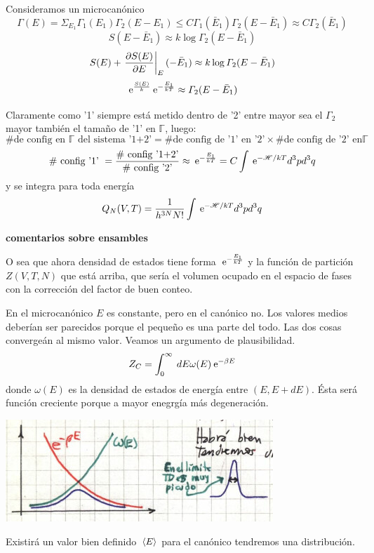 \documentclass[10pt,oneside]{CBFT_book}
\begin{document}
Consideramos un microcanónico 
\[
	\Gamma(E) = \Sigma_{E_1} \Gamma_1(E_1) \Gamma_2(E-E_1) \leq C \Gamma_1(\bar{E}_1) \Gamma_2(E-\bar{E}_1)
	\approx C \Gamma_2(\bar{E}_1)
\]
\[
	S(E-\bar{E}_1) \approx k \log \Gamma_2(E-\bar{E}_1)
\]
\[
	S(E) + \left.\frac{\partial^{\hspace{-0.05em}} {S(E)}}{\partial {E}^{\hspace{-0.05em}}}\right|_E(-\bar{E}_1) \approx k \log \Gamma_2(E-\bar{E}_1)
\]
\[
	\:\mathrm{e}^{\frac{S(E)}{k}} \:\mathrm{e}^{-\frac{E_1}{kT}} \approx \Gamma_2(E-\bar{E}_1)
\]

Claramente como '1' siempre está metido dentro de '2' entre mayor sea el $\Gamma_2$ mayor también el tamaño de '1'
en $\mathbb{\Gamma}$, luego:
\[
	\# \text{de config en } \mathbb{\Gamma} \text{ del sistema '1+2'} = \# \text{de config de '1' en '2'} \times 
	\# \text{de config de '2' en} \mathbb{\Gamma}
\]
\[
	\# \text{ config '1' } = \frac{ \# \text{ config '1+2'} }{ \# \text{ config '2'} } \approx 
	\:\mathrm{e}^{-\frac{E_1}{kT}} = C \int \:\mathrm{e}^{-\mathscr{H}/kT} d^3p d^3q
\]
y se integra para toda energía
\[
	Q_N(V,T) = \frac{1}{h^{3N}N!}\int \:\mathrm{e}^{-\mathscr{H}/kT} d^3p d^3q
\]

{\bf comentarios sobre ensambles}

O sea que ahora densidad de estados tiene forma $\:\mathrm{e}^{-\frac{E_1}{kT}}$ y la función de partición
$Z(V,T,N)$ que está arriba, que sería el volumen ocupado en el espacio de fases con la corrección
del factor de buen conteo.


En el microcanónico $E$ es constante, pero en el canónico no. Los valores medios deberían ser parecidos
porque el pequeño es una parte del todo.
Las dos cosas convergeán al mismo valor. Veamos un argumento de plausibilidad.
\[
	Z_C = \int_0^\infty \: dE \omega(E) \:\mathrm{e}^{-\beta E}
\]
donde $\omega(E)$ es la densidad de estados de energía entre $(E,E+dE)$. Ésta será función creciente
porque a mayor enegrgía más degeneración.

\includegraphics[scale=0.5]{images/1606329392.jpg}

Existirá un valor bien definido $\:\left\langle E \right\rangle$ para el canónico tendremos una distribución.
\end{document}
